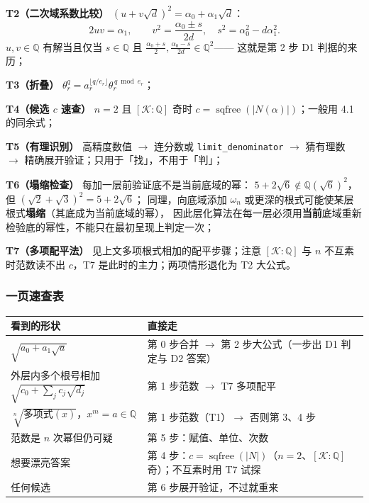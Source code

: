 \documentclass[UTF8,a4paper,11pt]{ctexart}
\begin{document}
\textbf{T2（二次域系数比较）} $(u+v\sqrt d)^2=\alpha_0+\alpha_1\sqrt d$：
\[
2uv=\alpha_1,\qquad v^2=\frac{\alpha_0\pm s}{2d},\quad s^2=\alpha_0^2-d\alpha_1^2 .
\]
$u,v\in\mathbb{Q}$ 有解当且仅当 $s\in\mathbb{Q}$ 且
$\tfrac{\alpha_0+s}2,\tfrac{\alpha_0-s}{2d}\in\mathbb{Q}^2$——
这就是第 2 步 D1 判据的来历；\par

\textbf{T3（折叠）} $\theta_r^{q}=a_r^{\lfloor q/e_r\rfloor}\theta_r^{\,q\bmod e_r}$；\par

\textbf{T4（候选 $c$ 速查）} $n=2$ 且 $[\mathscr{K}:\mathbb{Q}]$ 奇时
$c=\operatorname{sqfree}(|N(\alpha)|)$；一般用 4.1 的同余式；\par

\textbf{T5（有理识别）} 高精度数值 $\to$ 连分数或 \texttt{limit\_denominator}
$\to$ 猜有理数 $\to$ 精确展开验证；只用于「找」，不用于「判」；\par

\textbf{T6（塌缩检查）} 每加一层前验证底不是当前底域的幂：
$5+2\sqrt6\notin\mathbb{Q}(\sqrt6)^2$，但 $(\sqrt2+\sqrt3)^2=5+2\sqrt6$；
同理，向底域添加 $\omega_n$ 或更深的根式可能使某层根式\textbf{塌缩}（其底成为当前底域的幂），
因此层化算法在每一层必须用\textbf{当前}底域重新检验底的幂性，不能只在最初呈现上判定一次；\par

\textbf{T7（多项配平法）} 见上文多项根式相加的配平步骤；注意 $[\mathscr{K}:\mathbb{Q}]$ 与 $n$
不互素时范数读不出 $c$，T7 是此时的主力；两项情形退化为 T2 大公式。\par

\subsubsection{一页速查表}

\begin{center}
\begin{tabularx}{\textwidth}{@{}lX@{}}
\toprule
看到的形状 & 直接走 \\
\midrule
$\sqrt{a_0+a_1\sqrt a}$ & 第 0 步合并 $\to$ 第 2 步大公式（一步出 D1 判定与 D2 答案） \\
外层内多个根号相加 $\sqrt{c_0+\sum_jc_j\sqrt{d_j}}$ & 第 1 步范数 $\to$ T7 多项配平 \\
$\sqrt[n]{\text{多项式}(x)}$，$x^m=a\in\mathbb{Q}$ & 第 1 步范数（T1）$\to$ 否则第 3、4 步 \\
范数是 $n$ 次幂但仍可疑 & 第 5 步：赋值、单位、次数 \\
想要漂亮答案 & 第 4 步：$c=\operatorname{sqfree}(|N|)$（$n=2$、$[\mathscr{K}:\mathbb{Q}]$ 奇）；不互素时用 T7 试探 \\
任何候选 & 第 6 步展开验证，不过就重来 \\
\bottomrule
\end{tabularx}
\end{center}
\end{document}
